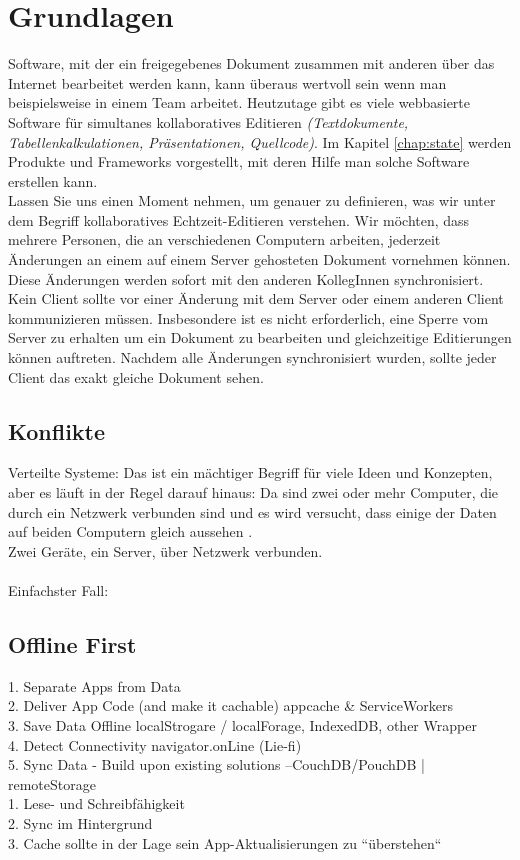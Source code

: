 \chapter{\label{chap:grundlagen}Grundlagen}
Software, mit der ein freigegebenes Dokument zusammen mit anderen über das Internet bearbeitet werden kann, kann überaus wertvoll sein wenn man beispielsweise in einem Team arbeitet. Heutzutage gibt es viele webbasierte Software für simultanes kollaboratives Editieren \textit{(Textdokumente, Tabellenkalkulationen, Präsentationen, Quellcode)}. Im Kapitel \ref{chap:state} werden Produkte und Frameworks vorgestellt, mit deren Hilfe man solche Software erstellen kann.\\
Lassen Sie uns einen Moment nehmen, um genauer zu definieren, was wir unter dem Begriff kollaboratives Echtzeit-Editieren verstehen.
Wir möchten, dass mehrere Personen, die an verschiedenen Computern arbeiten, jederzeit Änderungen an einem auf einem Server gehosteten Dokument vornehmen können. Diese Änderungen werden sofort mit den anderen KollegInnen synchronisiert. Kein Client sollte vor einer Änderung mit dem Server oder einem anderen Client kommunizieren müssen. Insbesondere ist es nicht erforderlich, eine Sperre vom Server zu erhalten um ein Dokument zu bearbeiten und gleichzeitige Editierungen können auftreten. Nachdem alle Änderungen synchronisiert wurden, sollte jeder Client das exakt gleiche Dokument sehen.
%
%
\section{\label{sec:konflikte}Konflikte}
Verteilte Systeme: Das ist ein mächtiger Begriff für viele Ideen und Konzepten, aber es läuft in der Regel darauf hinaus: Da sind zwei oder mehr Computer, die durch ein Netzwerk verbunden sind und es wird versucht, dass einige der Daten auf beiden Computern gleich aussehen .\\
Zwei Geräte, ein Server, über Netzwerk verbunden.\\\\
Einfachster Fall:

%
%
\section{Offline First}
1. Separate Apps from Data\\
2. Deliver App Code (and make it cachable) {appcache \& ServiceWorkers}\\
3. Save Data Offline {localStrogare / localForage, IndexedDB, other Wrapper}\\
4. Detect Connectivity {navigator.onLine} (Lie-fi)\\
5. Sync Data - Build upon existing solutions --CouchDB/PouchDB | remoteStorage\\
%
%
1. Lese- und Schreibfähigkeit\\
2. Sync im Hintergrund\\
3. Cache sollte in der Lage sein App-Aktualisierungen zu ``überstehen``
%
%
